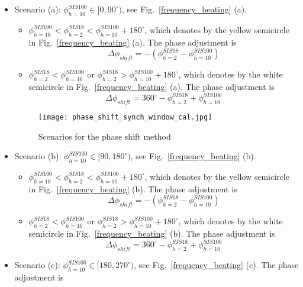 \begin{itemize}
    \item Scenario (a): $\phi_{h=10}^{SIS100}\in [0,90^\circ)$, see Fig.~\ref{frequency_beating} (a).

	\begin{itemize}
		\item $\phi_{h=10}^{SIS100}< \phi_{h=2}^{SIS18}< \phi_{h=10}^{SIS100} +180^\circ$, which denotes by the yellow semicircle in Fig.~\ref{frequency_beating} (a). The phase adjustment is
    \begin{equation}
			\Delta \phi_{shift}=-(\phi_{h=2}^{SIS18} - \phi_{h=10}^{SIS100})
    \end{equation}
    		\item $\phi_{h=2}^{SIS18} < \phi_{h=10}^{SIS100}$ or  $\phi_{h=2}^{SIS18} >\phi_{h=10}^{SIS100} +180^\circ$, which denotes by the white semicircle in Fig.~\ref{frequency_beating} (a). The phase adjustment is
    \begin{equation}
			\Delta \phi_{shift}= 360^\circ - \phi_{h=2}^{SIS18} + \phi_{h=10}^{SIS100}
    \end{equation}
	\end{itemize}
\begin{figure}[H]
   \centering   
   \texttt{[image: phase\_shift\_synch\_window\_cal.jpg]}
   \caption{Scenarios for the phase shift method}
   \label{phase_shift}
\end{figure}
    \item Scenario (b): $\phi_{h=10}^{SIS100}\in [90,180^\circ)$, see Fig.~\ref{frequency_beating} (b). 

	\begin{itemize}
		\item $\phi_{h=10}^{SIS100}< \phi_{h=2}^{SIS18}< \phi_{h=10}^{SIS100} +180^\circ$, which denotes by the yellow semicircle in Fig.~\ref{frequency_beating} (b). The phase adjustment is
	    \begin{equation}		
\Delta \phi_{shift}=-(\phi_{h=2}^{SIS18} - \phi_{h=10}^{SIS100})
    \end{equation}
    		\item $\phi_{h=2}^{SIS18} < \phi_{h=10}^{SIS100}$ or  $\phi_{h=2}^{SIS18} >\phi_{h=10}^{SIS100} +180^\circ$, which denotes by the white semicircle in Fig.~\ref{frequency_beating} (b).  The phase adjustment is
    \begin{equation}			
\Delta \phi_{shift}=360^\circ - \phi_{h=2}^{SIS18} + \phi_{h=10}^{SIS100}
    \end{equation}
	\end{itemize}
    \item Scenario (c): $\phi_{h=10}^{SIS100}\in [180,270^\circ)$, see Fig.~\ref{frequency_beating} (c). The phase adjustment is


\end{itemize}
